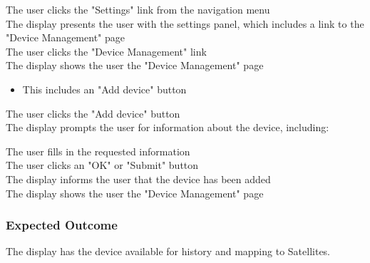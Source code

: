The user clicks the "Settings" link from the navigation menu\\
The display presents the user with the settings panel, which includes a link to the "Device Management" page\\
The user clicks the "Device Management" link\\
The display shows the user the "Device Management" page
\begin{itemize}
	\item This includes an "Add device" button
\end{itemize}
The user clicks the "Add device" button\\
The display prompts the user for information about the device, including:
The user fills in the requested information\\
The user clicks an "OK" or "Submit" button\\
The display informs the user that the device has been added\\
The display shows the user the "Device Management" page

\subsubsection{Expected Outcome}

The display has the device available for history and mapping to Satellites. 